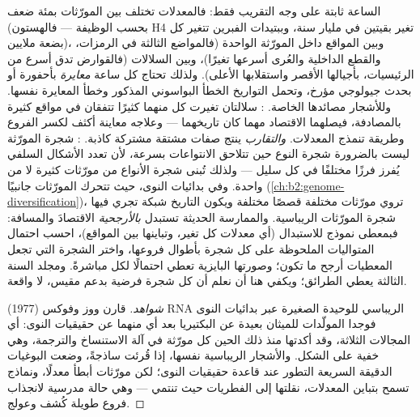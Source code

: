 \begin{proposition}\label{prop:b2:phylogenetic-trees:pitfalls}
الساعة ثابتة على وجه التقريب فقط: فالمعدلات تختلف بين
المورّثات بمئة ضعف (بحسب الوظيفة --- فالهستون H4 تغير
بقيتين في مليار سنة، وببتيدات الفبرين تتغير كل بضعة
ملايين)، وبين المواقع داخل المورّثة الواحدة (فالمواضع الثالثة في الرمزات،
والقطع الداخلية والعُرى أسرعها تغيرًا)، وبين السلالات (فالقوارض
تدق أسرع من الرئيسيات، بأجيالها الأقصر
واستقلابها الأعلى). ولذلك تحتاج كل ساعة
\emph{معايرة} بأحفورة أو بحدث جيولوجي مؤرخ،
وتحمل التواريخ الخطأ البواسوني المذكور وخطأ المعايرة نفسها.
وللأشجار مصائدها الخاصة. \emph{}: سلالتان
تغيرت كل منهما كثيرًا تتفقان في مواقع كثيرة
بالمصادفة، فيصلهما الاقتصاد مهما كان تاريخهما --- وعلاجه
معاينة أكثف لكسر الفروع وطريقة
تنمذج المعدلات. \emph{والتقارب} ينتج صفات مشتقة مشتركة كاذبة.
\emph{}: شجرة المورّثة ليست بالضرورة
شجرة النوع حين تتلاحق الانتواعات بسرعة، لأن
تعدد الأشكال السلفي يُفرز فرزًا مختلفًا في كل سليل
--- ولذلك تُبنى شجرة الأنواع من مورّثات كثيرة لا من واحدة. وفي
بدائيات النوى، حيث تتحرك المورّثات جانبيًا
(\cref{ch:b2:genome-diversification})، تروي مورّثات مختلفة
قصصًا مختلفة ويكون التاريخ شبكة تجري فيها شجرة المورّثات
الريباسية. والممارسة الحديثة تستبدل \emph{بالأرجحية} الاقتصادَ
والمسافة: فبمعطى نموذج للاستبدال (أي معدلات كل
تغير، وتباينها بين المواقع)، احسب
احتمال المتواليات الملحوظة على كل شجرة بأطوال فروعها،
واختر الشجرة التي تجعل المعطيات أرجح ما تكون؛
وصورتها البايزية تعطي احتمالًا لكل  مباشرةً.
ومجلد السنة الثالثة يعطي الطرائق؛ ويكفي هنا أن نعلم أن
كل شجرة فرضية بدعم مقيس، لا واقعة.
\end{proposition}
\begin{proof}[شواهد]
قارن ووز وفوكس (1977) RNA الريباسي للوحيدة الصغيرة عبر
بدائيات النوى فوجدا المولّدات للميثان بعيدة عن البكتيريا
بعد أي منهما عن حقيقيات النوى: أي المجالات الثلاثة، وقد أكدتها منذ ذلك الحين كل
مورّثة في آلة الاستنساخ والترجمة، وهي
خفية على الشكل. والأشجار الريباسية نفسها، إذا قُرئت ساذجةً،
وضعت البوغيات الدقيقة السريعة التطور عند قاعدة
حقيقيات النوى؛ لكن مورّثات أبطأ معدلًا، ونماذج تسمح بتباين
المعدلات، نقلتها إلى الفطريات حيث تنتمي --- وهي
حالة مدرسية لانجذاب فروع طويلة كُشف وعولج.
\end{proof}

